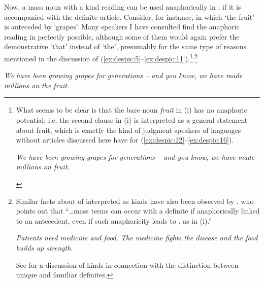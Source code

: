 \documentclass[output=paper,
modfonts
]{langscibook}
\begin{document}
	Now, a mass noun with a kind reading can be used anaphorically in , if it is accompanied
	with the definite article. Consider, for instance,  in which `the fruit' is anteceded by `grapes'.
	Many speakers I have consulted find the anaphoric reading in  perfectly possible, although
	some of them would again prefer the demonstrative `that' instead of `the', presumably for the
	same type of reasons mentioned in the discussion of (\ref{ex:despic:5}--\ref{ex:despic:11}).\footnote{What seems to be clear is that the bare noun \textit{fruit} in (i) has no anaphoric potential; i.e. the second clause in (i) is interpreted as a general statement about fruit, which is exactly the kind of judgment speakers of languages without
		articles discussed here have for (\ref{ex:despic:12}--\ref{ex:despic:16}).
		
		\begin{exe}
			 \label{ex:despic:n6}
			\textit{We have been growing grapes for generations -- and you know, we have made millions on fruit.}
		\end{exe}
	}\textsuperscript{,}\footnote{Similar facts about  of  interpreted as kinds have also been observed by \citet[ft. 43, 435--436]{Dayal2004}, who points out that ``\ldots mass terms can occur with a definite if anaphorically linked to an antecedent, even if such anaphoricity leads to , as in (i).''
		\begin{exe}
		 \textit{Patients need medicine and food. {\op}The{\cp} medicine fights the disease and {\op}the{\cp} food builds up strength.}
		\label{ex:despic:n7}
		\end{exe} 
		See  for a discussion of kinds in connection with the distinction between unique and familiar definites.   
	}
	
	
	\ea \label{ex:despic:17}
	\textit{We have been growing grapes for generations -- and you know, we have made millions on
		the fruit.}
	\z
	
\end{document}
